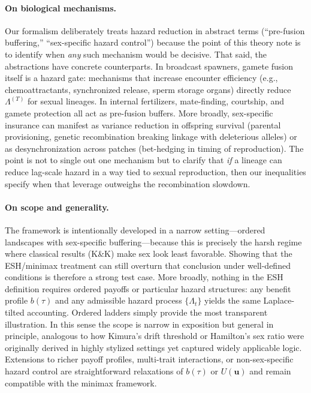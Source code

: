 \documentclass[11pt]{article}
\theoremstyle{upright}
\newcommand{\hazT}[1]{\Lambda^{(#1)}}          %
\begin{document}
\paragraph{On biological mechanisms.}
Our formalism deliberately treats hazard reduction in abstract terms (``pre-fusion buffering,'' ``sex-specific hazard control'') because the point of this theory note is to identify when \emph{any} such mechanism would be decisive. That said, the abstractions have concrete counterparts. In broadcast spawners, gamete fusion itself is a hazard gate: mechanisms that increase encounter efficiency (e.g., chemoattractants, synchronized release, sperm storage organs) directly reduce $\hazT{T}$ for sexual lineages. In internal fertilizers, mate-finding, courtship, and gamete protection all act as pre-fusion buffers. More broadly, sex-specific insurance can manifest as variance reduction in offspring survival (parental provisioning, genetic recombination breaking linkage with deleterious alleles) or as desynchronization across patches (bet-hedging in timing of reproduction). The point is not to single out one mechanism but to clarify that \emph{if} a lineage can reduce lag-scale hazard in a way tied to sexual reproduction, then our inequalities specify when that leverage outweighs the recombination slowdown.

\paragraph{On scope and generality.}
The framework is intentionally developed in a narrow setting—ordered landscapes with sex-specific buffering—because this is precisely the harsh regime where classical results (K\&K) make sex look least favorable. Showing that the ESH/minimax treatment can still overturn that conclusion under well-defined conditions is therefore a strong test case. More broadly, nothing in the ESH definition requires ordered payoffs or particular hazard structures: any benefit profile $b(\tau)$ and any admissible hazard process $\{\Lambda_t\}$ yields the same Laplace-tilted accounting. Ordered ladders simply provide the most transparent illustration. In this sense the scope is narrow in exposition but general in principle, analogous to how Kimura’s drift threshold or Hamilton’s sex ratio were originally derived in highly stylized settings yet captured widely applicable logic. Extensions to richer payoff profiles, multi-trait interactions, or non-sex-specific hazard control are straightforward relaxations of $b(\tau)$ or $U(\mathbf u)$ and remain compatible with the minimax framework.
\end{document}
